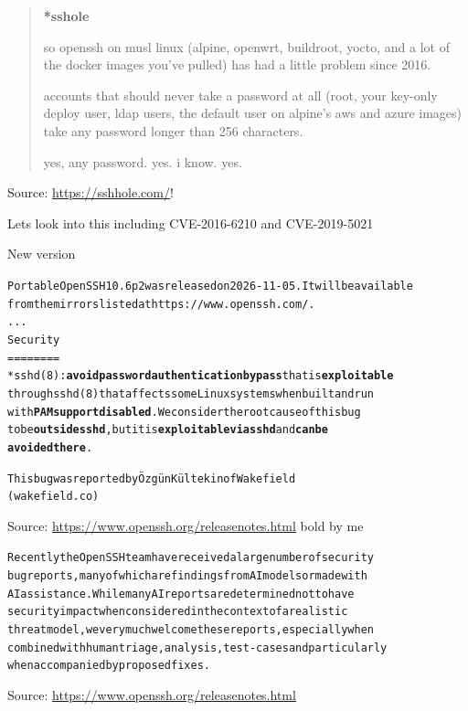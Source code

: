 \documentclass[Screen16to9,17pt]{foils}
\begin{document}
\breakdance



\begin{quote}{\bf\large
*sshole}

so openssh on musl linux (alpine, openwrt, buildroot, yocto, and a lot of the docker images you've pulled) has had a little problem since 2016.

accounts that should never take a password at all (root, your key-only deploy user, ldap users, the default user on alpine's aws and azure images) take any password longer than 256 characters.

yes, any password. yes. i know. yes.
\end{quote}
Source: \url{https://sshhole.com/}!

Lets look into this including CVE-2016-6210 and CVE-2019-5021


New version
\begin{alltt}\small
Portable OpenSSH 10.6p2 was released on 2026-11-05. It will be available
from the mirrors listed at https://www.openssh.com/.
...
Security
========
 * sshd(8): \textbf{avoid password authentication bypass} that is \textbf{exploitable}
   through sshd(8) that affects some Linux systems when built and run
   with \textbf{PAM support disabled}. We consider the root cause of this bug
   to be \textbf{outside sshd}, but it is \textbf{exploitable via sshd} and \textbf{can be
   avoided there}.

   This bug was reported by Özgün Kültekin of Wakefield
   (wakefield.co)
\end{alltt}
Source: \url{https://www.openssh.org/releasenotes.html} bold by me


\begin{alltt}\small
Recently the OpenSSH team have received a large number of security
bug reports, many of which are findings from AI models or made with
AI assistance. While many AI reports are determined not to have
security impact when considered in the context of a realistic
threat model, we very much welcome these reports, especially when
combined with human triage, analysis, test-cases and particularly
when accompanied by proposed fixes.
\end{alltt}
Source: \url{https://www.openssh.org/releasenotes.html}
\end{document}
